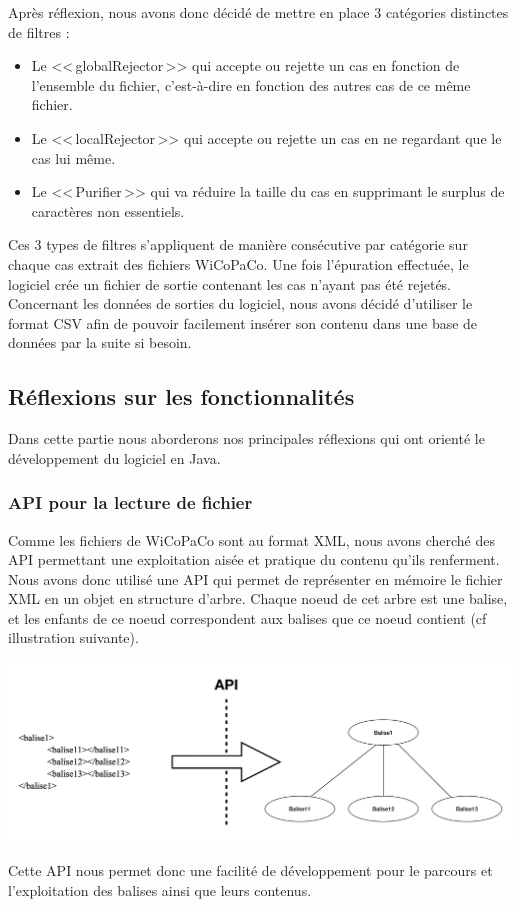\documentclass[11pt]{article}
\begin{document}
Apr\`{e}s r\'{e}flexion, nous avons donc d\'{e}cid\'{e} de mettre en place 3 cat\'{e}gories distinctes de filtres :
\begin{itemize}
\item Le <<\,globalRejector\,>> qui accepte ou rejette un cas en fonction de l'ensemble du fichier, c'est-\`{a}-dire en fonction des autres cas de ce m\^{e}me fichier.
\item Le <<\,localRejector\,>> qui accepte ou rejette un cas en ne regardant que le cas lui m\^{e}me.
\item Le <<\,Purifier\,>> qui va r\'{e}duire la taille du cas en supprimant le surplus de caract\`{e}res non essentiels.
\end{itemize}
Ces 3 types de filtres s'appliquent de mani\`{e}re cons\'{e}cutive par cat\'{e}gorie sur chaque cas extrait des fichiers WiCoPaCo. Une fois l'\'{e}puration effectu\'{e}e, le logiciel cr\'{e}e un fichier de sortie contenant les cas n'ayant pas \'{e}t\'{e} rejet\'{e}s. Concernant les donn\'{e}es de sorties du logiciel, nous avons d\'{e}cid\'{e} d'utiliser le format CSV afin de pouvoir facilement ins\'{e}rer son contenu dans une base de donn\'{e}es par la suite si besoin.

\subsection{R\'{e}flexions sur les fonctionnalit\'{e}s}
Dans cette partie nous aborderons nos principales r\'{e}flexions qui ont orient\'{e} le d\'{e}veloppement du logiciel en Java.
\subsubsection{API pour la lecture de fichier}
Comme les fichiers de WiCoPaCo sont au format XML, nous avons cherch\'{e} des API permettant une exploitation ais\'{e}e et pratique du contenu qu'ils renferment. Nous avons donc utilis\'{e} une API qui permet de repr\'{e}senter en m\'{e}moire le fichier XML en un objet en structure d'arbre. Chaque noeud de cet arbre est une balise, et les enfants de ce noeud correspondent aux balises que ce noeud contient (cf illustration suivante). 

\begin{center}
\includegraphics[width=14cm]{exemple9.png} %
\end{center}
	Cette API nous permet donc une facilit\'{e} de d\'{e}veloppement pour le parcours et l'exploitation des balises ainsi que leurs contenus.
\end{document}

